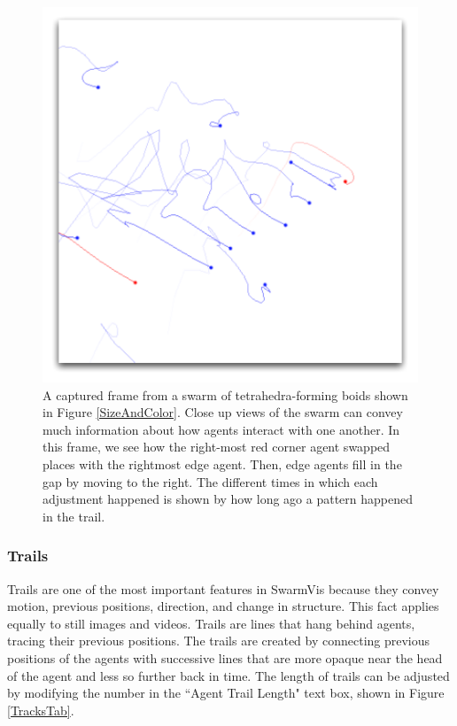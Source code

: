 \documentclass[conference]{IEEEtran}
\begin{document}
\begin{figure}
\centering
\includegraphics[scale=.5]{images/closeuptrails.pdf}
\caption{
A captured frame from a swarm of tetrahedra-forming boids shown in Figure \ref{SizeAndColor}.
Close up views of the swarm can convey much information about how agents interact with one another.
In this frame, we see how the right-most red corner agent swapped places with the rightmost edge agent.
Then, edge agents fill in the gap by moving to the right. The different times in which each adjustment happened
is shown by how long ago a pattern happened in the trail.}
\label{CloseTrails}
\end{figure}

\subsubsection{Trails}

Trails are one of the most important features in SwarmVis because they convey motion, previous positions, direction,
and change in structure. This fact applies equally to still images and videos. Trails are lines that hang behind agents, tracing
their previous positions. 
The trails are created by connecting previous positions of the agents with
successive lines that are more opaque near the head of the agent and less so further back in time.
The length of trails can be adjusted by modifying the number in the ``Agent Trail Length" text box, shown in
Figure \ref{TracksTab}.
\end{document}
